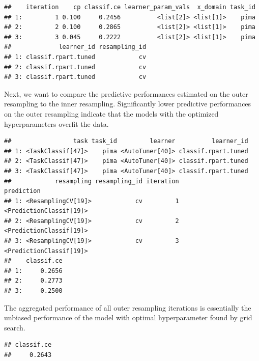 \documentclass[
]{scrbook}
\newenvironment{Shaded}{\begin{snugshade}}{\end{snugshade}}
\newcommand{\FunctionTok}[1]{\textcolor[rgb]{0.00,0.00,0.00}{#1}}
\newcommand{\NormalTok}[1]{#1}
\newcommand{\SpecialCharTok}[1]{\textcolor[rgb]{0.00,0.00,0.00}{#1}}
\renewenvironment{Shaded} {\begin{snugshade}\small} {\end{snugshade}}
\begin{document}
\begin{verbatim}
##    iteration    cp classif.ce learner_param_vals  x_domain task_id
## 1:         1 0.100     0.2456          <list[2]> <list[1]>    pima
## 2:         2 0.100     0.2865          <list[2]> <list[1]>    pima
## 3:         3 0.045     0.2222          <list[2]> <list[1]>    pima
##             learner_id resampling_id
## 1: classif.rpart.tuned            cv
## 2: classif.rpart.tuned            cv
## 3: classif.rpart.tuned            cv
\end{verbatim}

Next, we want to compare the predictive performances estimated on the outer resampling to the inner resampling.
Significantly lower predictive performances on the outer resampling indicate that the models with the optimized hyperparameters overfit the data.

\begin{Shaded}
\end{Shaded}

\begin{verbatim}
##                 task task_id         learner          learner_id
## 1: <TaskClassif[47]>    pima <AutoTuner[40]> classif.rpart.tuned
## 2: <TaskClassif[47]>    pima <AutoTuner[40]> classif.rpart.tuned
## 3: <TaskClassif[47]>    pima <AutoTuner[40]> classif.rpart.tuned
##            resampling resampling_id iteration              prediction
## 1: <ResamplingCV[19]>            cv         1 <PredictionClassif[19]>
## 2: <ResamplingCV[19]>            cv         2 <PredictionClassif[19]>
## 3: <ResamplingCV[19]>            cv         3 <PredictionClassif[19]>
##    classif.ce
## 1:     0.2656
## 2:     0.2773
## 3:     0.2500
\end{verbatim}

The aggregated performance of all outer resampling iterations is essentially the unbiased performance of the model with optimal hyperparameter found by grid search.

\begin{Shaded}
\end{Shaded}

\begin{verbatim}
## classif.ce 
##     0.2643
\end{verbatim}
\end{document}
